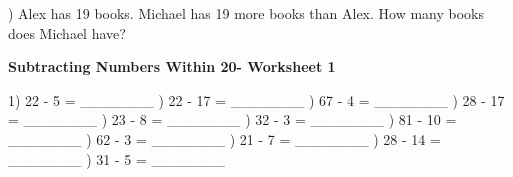 \documentclass{article}%
\begin{document}
\newline%
\newline%
) Alex has 19 books. Michael has 19 more books than Alex. How many books does Michael have?%
\newline%
\newline%
\newline%
\pagebreak%
\large%
\begin{center}%
\textbf{Subtracting Numbers Within 20- Worksheet 1}%
\newline%
\end{center} \normalsize%
1) 22 {-} 5 = \_\_\_\_\_\_\_%
\newline%
\newline%
) 22 {-} 17 = \_\_\_\_\_\_\_%
\newline%
\newline%
) 67 {-} 4 = \_\_\_\_\_\_\_%
\newline%
\newline%
) 28 {-} 17 = \_\_\_\_\_\_\_%
\newline%
\newline%
) 23 {-} 8 = \_\_\_\_\_\_\_%
\newline%
\newline%
) 32 {-} 3 = \_\_\_\_\_\_\_%
\newline%
\newline%
) 81 {-} 10 = \_\_\_\_\_\_\_%
\newline%
\newline%
) 62 {-} 3 = \_\_\_\_\_\_\_%
\newline%
\newline%
) 21 {-} 7 = \_\_\_\_\_\_\_%
\newline%
\newline%
) 28 {-} 14 = \_\_\_\_\_\_\_%
\newline%
\newline%
) 31 {-} 5 = \_\_\_\_\_\_\_%
\newline%
\newline%
\newline%
\end{document}
